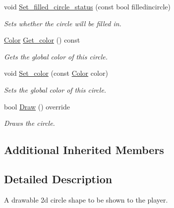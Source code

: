 \begin{DoxyCompactItemize}
void \hyperlink{classjetfuel_1_1draw_1_1Circle__2d__shape_a027d4640ee52708f5fa853f20ba2f899}{Set\+\_\+filled\+\_\+circle\+\_\+status} (const bool filledincircle)
\begin{DoxyCompactList}\small\item\em Sets whether the circle will be filled in. \end{DoxyCompactList}\item 
\hyperlink{classjetfuel_1_1draw_1_1Color}{Color} \hyperlink{classjetfuel_1_1draw_1_1Circle__2d__shape_ad7953fa383fdffedf6cdf9d6a3d9a1bb}{Get\+\_\+color} () const
\begin{DoxyCompactList}\small\item\em Gets the global color of this circle. \end{DoxyCompactList}\item 
void \hyperlink{classjetfuel_1_1draw_1_1Circle__2d__shape_a20ac0647e90c629f347e3c65a0315220}{Set\+\_\+color} (const \hyperlink{classjetfuel_1_1draw_1_1Color}{Color} color)
\begin{DoxyCompactList}\small\item\em Sets the global color of this circle. \end{DoxyCompactList}\item 
bool \hyperlink{classjetfuel_1_1draw_1_1Circle__2d__shape_a8be660f3cd624dc077d9003ee3b37212}{Draw} () override
\begin{DoxyCompactList}\small\item\em Draws the circle. \end{DoxyCompactList}\end{DoxyCompactItemize}
\subsection*{Additional Inherited Members}


\subsection{Detailed Description}
A drawable 2d circle shape to be shown to the player.

